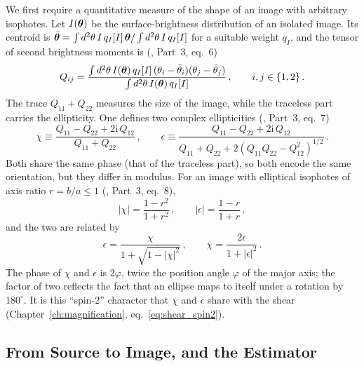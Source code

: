 We first require a quantitative measure of the shape of an image with
arbitrary isophotes.  Let $I(\boldsymbol{\theta})$ be the
surface-brightness distribution of an isolated image.  Its centroid is
$\bar{\boldsymbol{\theta}} = \int d^2\theta\, I\, q_I[I]\, \boldsymbol{\theta} /
\int d^2\theta\, I\, q_I[I]$ for a suitable weight $q_I$, and the tensor
of second brightness moments is
(\citealp{schneider_kochanek_wambsganss_2006}, Part~3, eq.~6)
\begin{equation}
    Q_{ij} = \frac{\int d^2\theta\, I(\boldsymbol{\theta})\, q_I[I]\,
    (\theta_i - \bar\theta_i)(\theta_j - \bar\theta_j)}
    {\int d^2\theta\, I(\boldsymbol{\theta})\, q_I[I]}\,,
    \qquad i,j \in \{1,2\}\,.
    \label{eq:wl_Qij}
\end{equation}
The trace $Q_{11} + Q_{22}$ measures the size of the image, while the
traceless part carries the ellipticity.  One defines two complex
ellipticities
(\citealp{schneider_kochanek_wambsganss_2006}, Part~3, eq.~7)
\begin{equation}
    \boxed{
    \chi \equiv \frac{Q_{11} - Q_{22} + 2\mathrm{i}\, Q_{12}}
    {Q_{11} + Q_{22}}\,,
    \qquad
    \epsilon \equiv \frac{Q_{11} - Q_{22} + 2\mathrm{i}\, Q_{12}}
    {Q_{11} + Q_{22} + 2\left(Q_{11}Q_{22} - Q_{12}^2\right)^{1/2}}\,.
    }
    \label{eq:wl_ellipticities}
\end{equation}
Both share the same phase (that of the traceless part), so both encode the
same orientation, but they differ in modulus.  For an image with elliptical
isophotes of axis ratio $r = b/a \le 1$
(\citealp{schneider_kochanek_wambsganss_2006}, Part~3, eq.~8),
\begin{equation}
    |\chi| = \frac{1 - r^2}{1 + r^2}\,,
    \qquad
    |\epsilon| = \frac{1 - r}{1 + r}\,,
    \label{eq:wl_chi_eps_r}
\end{equation}
and the two are related by
\begin{equation}
    \epsilon = \frac{\chi}{1 + \sqrt{1 - |\chi|^2}}\,,
    \qquad
    \chi = \frac{2\epsilon}{1 + |\epsilon|^2}\,.
    \label{eq:wl_chi_eps_transform}
\end{equation}
The phase of $\chi$ and $\epsilon$ is $2\varphi$, twice the position angle
$\varphi$ of the major axis; the factor of two reflects the fact that an
ellipse maps to itself under a rotation by $180^\circ$.  It is this
``spin-2'' character that $\chi$ and $\epsilon$ share with the shear
(Chapter~\ref{ch:magnification}, eq.~\ref{eq:shear_spin2}).

\subsection{From Source to Image, and the Estimator}

